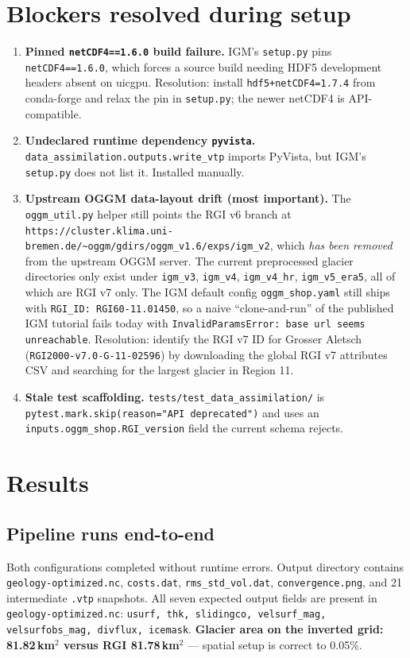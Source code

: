 \documentclass[11pt]{article}
\begin{document}
\section{Blockers resolved during setup}
\begin{enumerate}
\item \textbf{Pinned \texttt{netCDF4==1.6.0} build failure.} IGM's \texttt{setup.py} pins
\texttt{netCDF4==1.6.0}, which forces a source build needing HDF5 development headers
absent on uicgpu. Resolution: install \texttt{hdf5+netCDF4=1.7.4} from conda-forge and
relax the pin in \texttt{setup.py}; the newer netCDF4 is API-compatible.
\item \textbf{Undeclared runtime dependency \texttt{pyvista}.}
\texttt{data\_assimilation.outputs.write\_vtp} imports PyVista, but IGM's
\texttt{setup.py} does not list it. Installed manually.
\item \textbf{Upstream OGGM data-layout drift (most important).} The
\texttt{oggm\_util.py} helper still points the RGI v6 branch at
\texttt{https://cluster.klima.uni-bremen.de/\textasciitilde oggm/gdirs/oggm\_v1.6/exps/igm\_v2},
which \emph{has been removed} from the upstream OGGM server. The current preprocessed
glacier directories only exist under \texttt{igm\_v3}, \texttt{igm\_v4},
\texttt{igm\_v4\_hr}, \texttt{igm\_v5\_era5}, all of which are RGI v7 only. The IGM
default config \texttt{oggm\_shop.yaml} still ships with \texttt{RGI\_ID: RGI60-11.01450},
so a naive ``clone-and-run'' of the published IGM tutorial fails today with
\texttt{InvalidParamsError: base url seems unreachable}. Resolution: identify the RGI v7
ID for Grosser Aletsch (\texttt{RGI2000-v7.0-G-11-02596}) by downloading the global RGI v7
attributes CSV and searching for the largest glacier in Region 11.
\item \textbf{Stale test scaffolding.} \texttt{tests/test\_data\_assimilation/} is
\texttt{pytest.mark.skip(reason="API deprecated")} and uses an
\texttt{inputs.oggm\_shop.RGI\_version} field the current schema rejects.
\end{enumerate}

\section{Results}

\subsection{Pipeline runs end-to-end}
Both configurations completed without runtime errors. Output directory contains
\texttt{geology-optimized.nc}, \texttt{costs.dat}, \texttt{rms\_std\_vol.dat},
\texttt{convergence.png}, and 21 intermediate \texttt{.vtp} snapshots. All seven expected
output fields are present in \texttt{geology-optimized.nc}:
\texttt{usurf, thk, slidingco, velsurf\_mag, velsurfobs\_mag, divflux, icemask}.
\textbf{Glacier area on the inverted grid: 81.82\,km$^2$ versus RGI 81.78\,km$^2$} ---
spatial setup is correct to 0.05\%.
\end{document}
